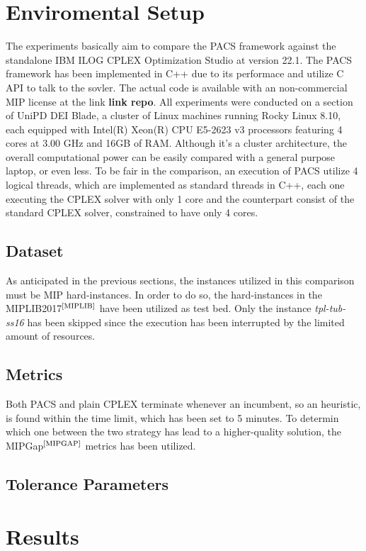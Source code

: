 \section{Enviromental Setup}
The experiments basically aim to compare the PACS framework against the standalone IBM ILOG CPLEX Optimization Studio at version 22.1.
The PACS framework has been implemented in C++ due to its performace and utilize C API to talk to the sovler. The actual code is available with an non-commercial MIP license at the link \textbf{link repo}. 
All experiments were conducted on a section of UniPD DEI Blade, a cluster of Linux machines running Rocky Linux 8.10, each equipped with Intel(R) Xeon(R) CPU E5-2623 v3 processors featuring 4 cores at 3.00 GHz and 16GB of RAM.
Although it's a cluster architecture, the overall computational power can be easily compared with a general purpose laptop, or even less.
To be fair in the comparison, an execution of PACS utilize 4 logical threads, which are implemented as standard threads in C++, each one executing the CPLEX solver with only 1 core and the counterpart consist of the standard CPLEX solver, constrained to have only 4 cores.
\subsection{Dataset}
As anticipated in the previous sections, the instances utilized in this comparison must be MIP hard-instances. In order to do so, the hard-instances in the MIPLIB2017$^\text{\cite{MIPLIB}}$ have been utilized as test bed. Only the instance \textit{tpl-tub-ss16} has been skipped since the execution has been interrupted by the limited amount of resources.
\subsection{Metrics}
Both PACS and plain CPLEX terminate whenever an incumbent, so an heuristic, is found within the time limit, which has been set to 5 minutes.
To determin which one between the two strategy has lead to a higher-quality solution, the MIPGap$^\text{\cite{MIPGAP}}$ metrics has been utilized.
\subsection{Tolerance Parameters}


\section{Results}
%
%
%